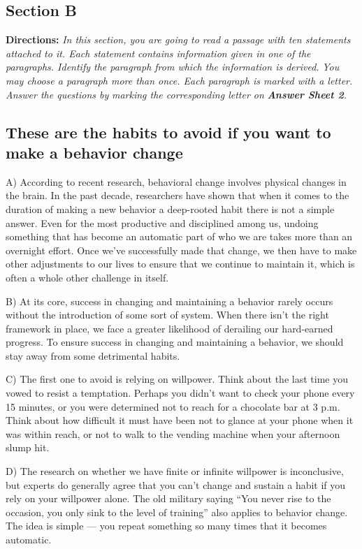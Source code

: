 \documentclass[UTF8,11pt]{ctexart}
\begin{document}
\subsection*{\textbf{Section B}}


\textbf{Directions:} \textit{In this section, you are going to read a passage with ten statements attached to it. Each statement} \textit{contains information given in one of the paragraphs. Identify the paragraph from which the information is derived.} \textit{You may choose a paragraph more than once. Each paragraph is marked with a letter. Answer the questions by} \textit{marking the corresponding letter on }\textbf{\textit{Answer Sheet 2}}\textit{.}


\subsection*{\textbf{These are the habits to avoid if you want to make a behavior change}}


A) According to recent research, behavioral change involves physical changes in the brain. In the past decade, researchers have shown that when it comes to the duration of making a new behavior a deep-rooted habit there is not a simple answer. Even for the most productive and disciplined among us, undoing something that has become an automatic part of who we are takes more than an overnight effort. Once we’ve successfully made that change, we then have to make other adjustments to our lives to ensure that we continue to maintain it, which is often a whole other challenge in itself.


B) At its core, success in changing and maintaining a behavior rarely occurs without the introduction of some sort of system. When there isn’t the right framework in place, we face a greater likelihood of derailing our hard-earned progress. To ensure success in changing and maintaining a behavior, we should stay away from some detrimental habits.


C) The first one to avoid is relying on willpower. Think about the last time you vowed to resist a temptation. Perhaps you didn’t want to check your phone every 15 minutes, or you were determined not to reach for a chocolate bar at 3 p.m. Think about how difficult it must have been not to glance at your phone when it was within reach, or not to walk to the vending machine when your afternoon slump hit.


D) The research on whether we have finite or infinite willpower is inconclusive, but experts do generally agree that you can’t change and sustain a habit if you rely on your willpower alone. The old military saying “You never rise to the occasion, you only sink to the level of training” also applies to behavior change. The idea is simple — you repeat something so many times that it becomes automatic.
\end{document}
